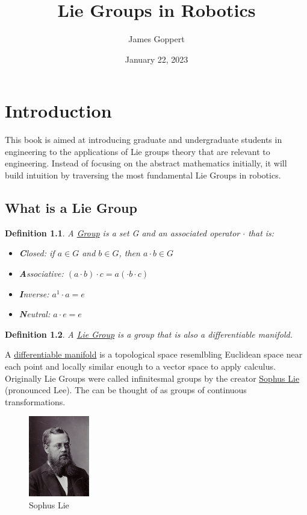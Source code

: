 \documentclass{book}
\title{Lie Groups in Robotics}
\author{James Goppert}
\date{January 22, 2023}
\newtheorem{definition}{Definition}
\begin{document}
\maketitle
\tableofcontents

\chapter{Introduction}

This book is aimed at introducing graduate and undergraduate students
in engineering to the applications of Lie groups theory that are 
relevant to engineering. Instead of focusing on the abstract 
mathematics initially, it will build intuition by traversing the most
fundamental Lie Groups in robotics.

\section{What is a Lie Group}

\begin{definition}
A \href{https://en.wikipedia.org/wiki/Group_(mathematics)}{Group} is a set G
and an associated operator $\cdot$ that is:
\begin{itemize}
    \item \textbf{C}losed: if $a \in G$ and $b \in G$, then $a \cdot b \in G$
    \item \textbf{A}ssociative: $(a \cdot b) \cdot c = a (\cdot b \cdot c)$
    \item \textbf{I}nverse: $a^{1}\cdot a = e$
    \item \textbf{N}eutral: $a \cdot e = e$
\end{itemize}
\end{definition}

\begin{definition}
    A \href{https://en.wikipedia.org/wiki/Lie_group}{Lie Group} is a group that
    is also a differentiable manifold.
    \end{definition}

A \href{https://en.wikipedia.org/wiki/Differentiable_manifold}{differentiable manifold}
is a topological space resemlbling Euclidean space near each point
and locally similar enough to a vector space to apply calculus. Originally Lie Groups were called infinitesmal groups by the creator
\href{https://en.wikipedia.org/wiki/Sophus_Lie}{Sophus Lie} (pronounced Lee).
The can be thought of as groups of continuous transformations.

\begin{figure}[htp]
    \centering
    \includegraphics[width=100px]{sophus_lie}
    \caption{Sophus Lie}
\end{figure}
\end{document}
